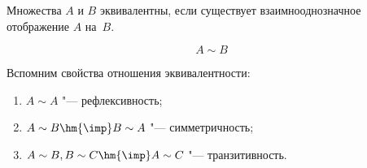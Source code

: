 
Множества $A$ и $B$ эквивалентны, если существует взаимнооднозначное отображение $A$ на~$B$.

\[A\sim B\]

Вспомним свойства отношения эквивалентности:

\begin{enumerate}
    \item $A\sim A$ "--- рефлексивность;

    \item $A\sim B \hm{\imp} B\sim A$ "--- симметричность;

    \item $A\sim B, B\sim C\hm{\imp} A\sim C$ "--- транзитивность.
\end{enumerate}
